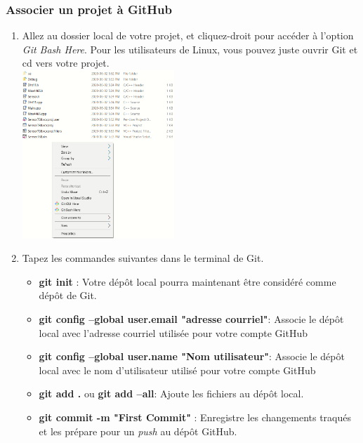 \documentclass{article}
\begin{document}
\subsubsection{Associer un projet à GitHub}

\begin{enumerate}
    \item Allez au dossier local de votre projet, et cliquez-droit pour accéder à l'option  \textit{Git Bash Here}. Pour les utilisateurs de Linux, vous pouvez juste ouvrir Git et cd vers votre projet.\\
    \includegraphics[width=0.45\textwidth, center]{Git_Bash_Here}
    
    \item Tapez les commandes suivantes dans le terminal de Git.
    \begin{itemize}
        \item \textbf{git init} : Votre dépôt local pourra maintenant être considéré comme dépôt de Git.
        
        \item \textbf{git config --global user.email "adresse courriel"}: Associe le dépôt local avec l'adresse courriel utilisée pour votre compte GitHub
        
        \item \textbf{git config --global user.name "Nom utilisateur"}: Associe le dépôt local avec le nom d'utilisateur utilisé pour votre compte GitHub
        
        \item \textbf{git add .} ou \textbf{git add --all}: Ajoute les fichiers au dépôt local.
        
        \item \textbf{git commit -m "First Commit"} : Enregistre les changements traqués et les prépare pour un \textit{push} au dépôt GitHub.
    

\end{itemize}
\end{enumerate}
\end{document}
